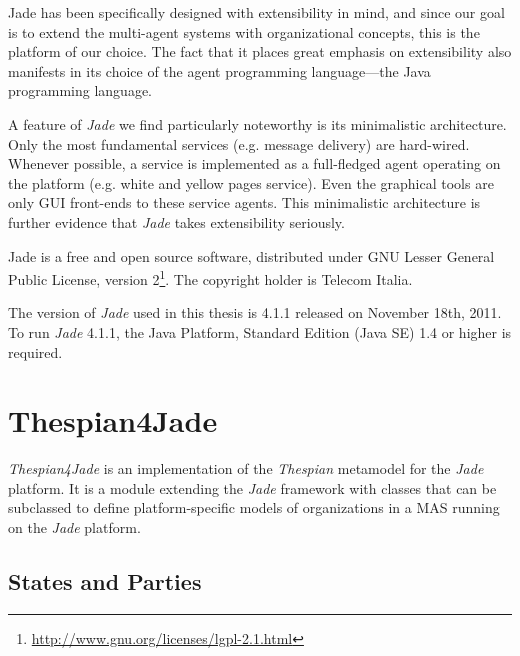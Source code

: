 Jade has been specifically designed with extensibility in mind, and since our goal is to extend the multi-agent systems with organizational concepts, this is the platform of our choice.
The fact that it places great emphasis on extensibility also manifests in its choice of the agent programming language---the Java programming language.

A feature of \textit{Jade} we find particularly noteworthy is its minimalistic architecture.
Only the most fundamental services (e.g. message delivery) are hard-wired.
Whenever possible, a service is implemented as a full-fledged agent operating on the platform (e.g. white and yellow pages service).
Even the graphical tools are only GUI front-ends to these service agents.
This minimalistic architecture is further evidence that \textit{Jade} takes extensibility seriously.

Jade is a free and open source software, distributed under GNU Lesser General Public License, version 2\footnote{\url{http://www.gnu.org/licenses/lgpl-2.1.html}}.
The copyright holder is Telecom Italia.

The version of \textit{Jade} used in this thesis is 4.1.1 released on November 18th, 2011.
To run \textit{Jade} 4.1.1, the Java Platform, Standard Edition (Java SE) 1.4 or higher is required.

\section{Thespian4Jade}

\textit{Thespian4Jade} is an implementation of the \textit{Thespian} metamodel for the \textit{Jade} platform.
It is a module extending the \textit{Jade} framework with classes that can be subclassed to define platform-specific models of organizations in a MAS running on the \textit{Jade} platform.

\subsection{States and Parties}

